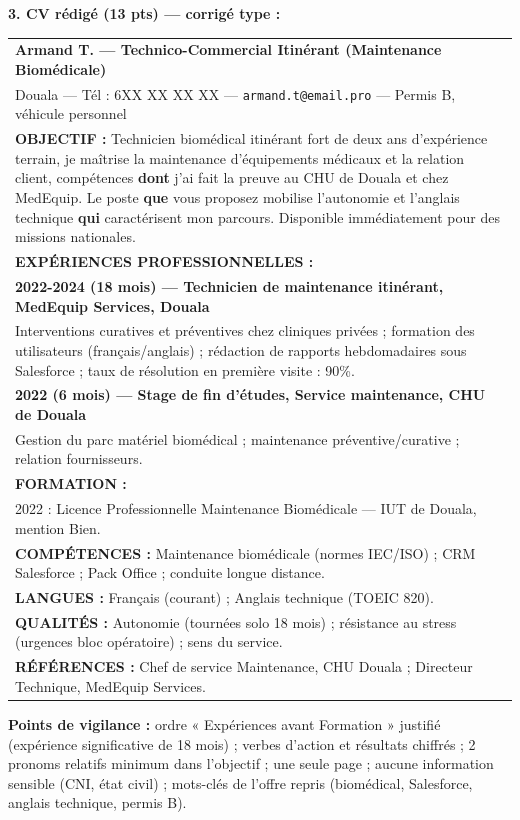 \documentclass[11pt]{article}
\begin{document}
\begin{corrige}
\textbf{3. CV rédigé (13 pts) — corrigé type :}
\begin{center}
\begin{tabularx}{\linewidth}{|X|}\hline
\rowcolor{popblueL} \textbf{Armand T. — Technico-Commercial Itinérant (Maintenance Biomédicale)} \\
Douala — Tél : 6XX XX XX XX — \texttt{armand.t@email.pro} — Permis B, véhicule personnel \\ \hline
\textbf{OBJECTIF :} Technicien biomédical itinérant fort de deux ans d'expérience terrain, je maîtrise la maintenance d'équipements médicaux et la relation client, compétences \textbf{dont} j'ai fait la preuve au CHU de Douala et chez MedEquip. Le poste \textbf{que} vous proposez mobilise l'autonomie et l'anglais technique \textbf{qui} caractérisent mon parcours. Disponible immédiatement pour des missions nationales. \\ \hline
\textbf{EXPÉRIENCES PROFESSIONNELLES :} \\
\textbf{2022-2024 (18 mois) — Technicien de maintenance itinérant, MedEquip Services, Douala} \\
Interventions curatives et préventives chez cliniques privées ; formation des utilisateurs (français/anglais) ; rédaction de rapports hebdomadaires sous Salesforce ; taux de résolution en première visite : 90\%. \\
\textbf{2022 (6 mois) — Stage de fin d'études, Service maintenance, CHU de Douala} \\
Gestion du parc matériel biomédical ; maintenance préventive/curative ; relation fournisseurs. \\ \hline
\textbf{FORMATION :} \\
2022 : Licence Professionnelle Maintenance Biomédicale — IUT de Douala, mention Bien. \\ \hline
\textbf{COMPÉTENCES :} Maintenance biomédicale (normes IEC/ISO) ; CRM Salesforce ; Pack Office ; conduite longue distance. \\ \hline
\textbf{LANGUES :} Français (courant) ; Anglais technique (TOEIC 820). \\ \hline
\textbf{QUALITÉS :} Autonomie (tournées solo 18 mois) ; résistance au stress (urgences bloc opératoire) ; sens du service. \\ \hline
\textbf{RÉFÉRENCES :} Chef de service Maintenance, CHU Douala ; Directeur Technique, MedEquip Services. \\ \hline
\end{tabularx}
\end{center}

\textbf{Points de vigilance :} ordre « Expériences avant Formation » justifié (expérience significative de 18 mois) ; verbes d'action et résultats chiffrés ; 2 pronoms relatifs minimum dans l'objectif ; une seule page ; aucune information sensible (CNI, état civil) ; mots-clés de l'offre repris (biomédical, Salesforce, anglais technique, permis B).
\end{corrige}
\end{document}
